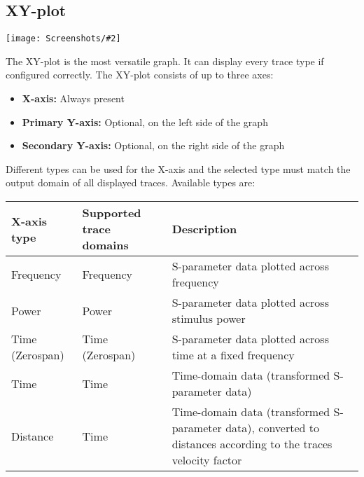 \documentclass[a4paper,11pt]{article}
\newcommand{\screenshot}[2]{\begin{center}
\texttt{[image: Screenshots/\#2]}
\end{center}}
\begin{document}
\subsection{XY-plot}
\screenshot{1.0}{GraphXYplot.png}
The XY-plot is the most versatile graph. It can display every trace type if configured correctly. The XY-plot consists of up to three axes:
\begin{itemize}
\item \textbf{X-axis:} Always present
\item \textbf{Primary Y-axis:} Optional, on the left side of the graph
\item \textbf{Secondary Y-axis:} Optional, on the right side of the graph
\end{itemize}
Different types can be used for the X-axis and the selected type must match the output domain of all displayed traces. Available types are:
\begin{center}
\begin{threeparttable}
\begin{tabularx}{\textwidth}{L{3cm}|X|L{7cm}}
    \toprule
    \textbf{X-axis type} & \textbf{Supported trace domains} & \textbf{Description} \\
    \hline
    Frequency & Frequency & S-parameter data plotted across frequency \\
    \hline
    Power & Power & S-parameter data plotted across stimulus power \\
    \hline
    Time (Zerospan) & Time (Zerospan) & S-parameter data plotted across time at a fixed frequency \\
    \hline
    Time & Time & Time-domain data (transformed S-parameter data) \\
\hline
    Distance & Time & Time-domain data (transformed S-parameter data), converted to distances according to the traces velocity factor \\
      \bottomrule
\end{tabularx}
\end{threeparttable}
\end{center}
\end{document}
